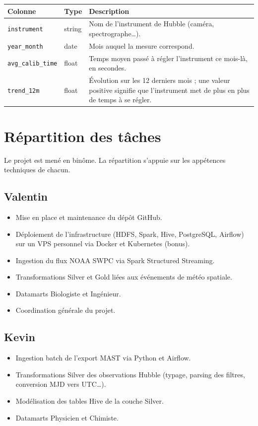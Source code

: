 \documentclass[11pt,a4paper]{article}
\begin{document}
\begin{tabularx}{\linewidth}{llX}
\toprule
\textbf{Colonne} & \textbf{Type} & \textbf{Description} \\
\midrule
\texttt{instrument}       & string & Nom de l'instrument de Hubble (caméra, spectrographe\dots). \\
\texttt{year\_month}      & date   & Mois auquel la mesure correspond. \\
\texttt{avg\_calib\_time} & float  & Temps moyen passé à régler l'instrument ce mois-là, en secondes. \\
\texttt{trend\_12m}       & float  & Évolution sur les 12 derniers mois ; une valeur positive signifie que l'instrument met de plus en plus de temps à se régler. \\
\bottomrule
\end{tabularx}

\newpage
\section{Répartition des tâches}

Le projet est mené en binôme. La répartition s'appuie sur les appétences techniques de chacun.

\subsection{Valentin}

\begin{itemize}
    \item Mise en place et maintenance du dépôt GitHub.
    \item Déploiement de l'infrastructure (HDFS, Spark, Hive, PostgreSQL, Airflow) sur un VPS personnel via Docker et Kubernetes (bonus).
    \item Ingestion du flux NOAA SWPC via Spark Structured Streaming.
    \item Transformations Silver et Gold liées aux événements de météo spatiale.
    \item Datamarts Biologiste et Ingénieur.
    \item Coordination générale du projet.
\end{itemize}

\subsection{Kevin}

\begin{itemize}
    \item Ingestion batch de l'export MAST via Python et Airflow.
    \item Transformations Silver des observations Hubble (typage, parsing des filtres, conversion MJD vers UTC\dots).
    \item Modélisation des tables Hive de la couche Silver.
    \item Datamarts Physicien et Chimiste.
\end{itemize}
\end{document}
